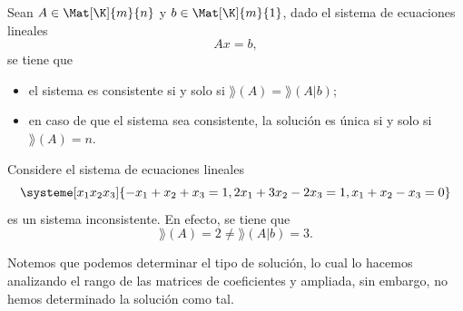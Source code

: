 \documentclass[compacto,10pt]{pubciencias-notas}
\begin{document}
\begin{teo}\label{Sem03TeoR-F}
    Sean $A\in \Mat[\K]{m}{n}$ y $b\in \Mat[\K]{m}{1}$, dado el sistema de ecuaciones lineales
    \[
        Ax=b,
    \]
    se tiene que
    \begin{itemize}
    \item
        el sistema es consistente si y solo si $\rang(A)=\rang(A|b)$;
    \item
        en caso de que el sistema sea consistente, la solución es única si y solo si $\rang(A)=n$.
    \end{itemize}
\end{teo}

\begin{ejem}\hspace{0pt} 
Considere el sistema de ecuaciones lineales
\[
    \systeme[x_1 x_2 x_3]{-x_1 +x_2 +x_3 = 1,
        2x_1 +3x_2 -2x_3 = 1,
        x_1 +x_2 -x_3 = 0}
\]
es un sistema inconsistente. En efecto, se tiene que 
\[
    \rang(A) = 2 \neq \rang(A|b) = 3.
\]
\end{ejem}

\begin{obs} Notemos que podemos determinar el tipo de solución, lo cual lo hacemos analizando el rango de las matrices de coeficientes y ampliada, sin embargo, no hemos determinado la solución como tal.
\end{obs}
\end{document}
